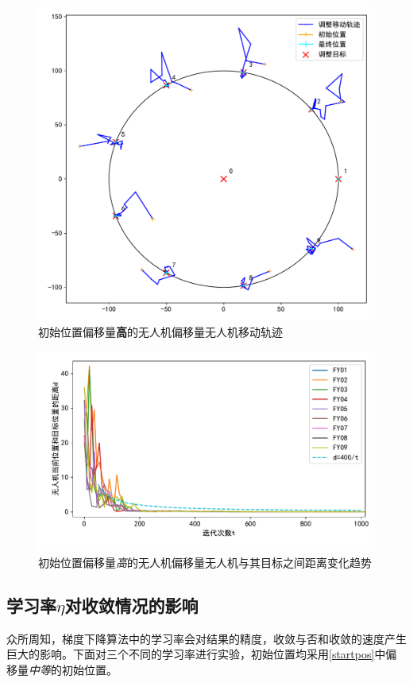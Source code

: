 \documentclass[withoutpreface,bwprint]{cumcmthesis} %
\begin{document}
\begin{figure}[H]
    \centering
    \includegraphics[width=0.7\linewidth]{figures/c9_noisy1.pdf}
    \caption{初始位置偏移量\textbf{高}的无人机偏移量无人机移动轨迹}
    \label{fig:Circle9_1}
\end{figure}
\begin{figure}[H]
    \centering
    \includegraphics[width=0.9\linewidth]{figures/c9_noisy1_conv.pdf}
    \caption{初始位置偏移量\textit{高}的无人机偏移量无人机与其目标之间距离变化趋势}
    \label{fig:Circle9_1_conv}
\end{figure}

\subsection{学习率$\eta$对收敛情况的影响}
众所周知，梯度下降算法中的学习率会对结果的精度，收敛与否和收敛的速度产生巨大的影响。下面对三个不同的学习率进行实验，初始位置均采用\ref{startpos}中偏移量\textit{中等}的初始位置。
\end{document}
